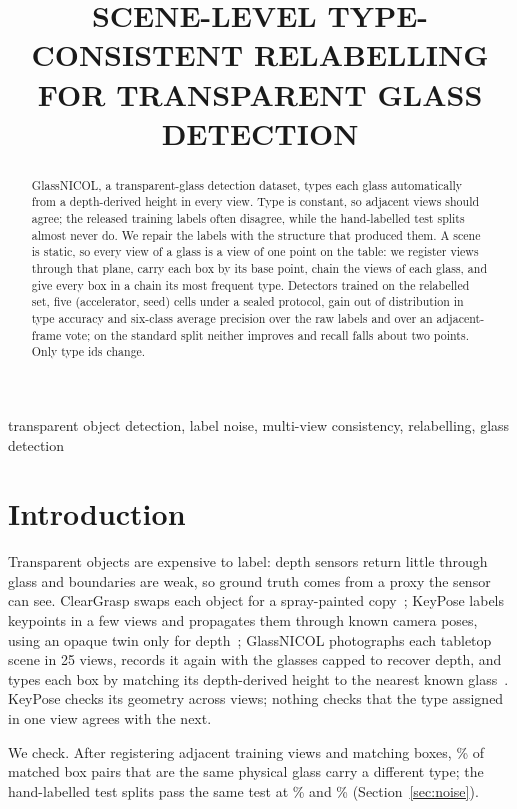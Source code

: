 \documentclass{article}
\title{SCENE-LEVEL TYPE-CONSISTENT RELABELLING FOR TRANSPARENT GLASS DETECTION}
\begin{document}
\ninept
\maketitle

\begin{abstract}
GlassNICOL, a transparent-glass detection dataset, types each glass automatically from a depth-derived height in every view. Type is constant, so adjacent views should agree; the released training labels often disagree, while the hand-labelled test splits almost never do. We repair the labels with the structure that produced them. A scene is static, so every view of a glass is a view of one point on the table: we register views through that plane, carry each box by its base point, chain the views of each glass, and give every box in a chain its most frequent type. Detectors trained on the relabelled set, five (accelerator, seed) cells under a sealed protocol, gain out of distribution in type accuracy and six-class average precision over the raw labels and over an adjacent-frame vote; on the standard split neither improves and recall falls about two points. Only type ids change.
\end{abstract}

\begin{keywords}
transparent object detection, label noise, multi-view consistency, relabelling, glass detection
\end{keywords}

\section{Introduction}
\label{sec:intro}
Transparent objects are expensive to label: depth sensors return little through glass and boundaries are weak, so ground truth comes from a proxy the sensor can see. ClearGrasp swaps each object for a spray-painted copy~\cite{sajjan2020cleargrasp}; KeyPose labels keypoints in a few views and propagates them through known camera poses, using an opaque twin only for depth~\cite{liu2020keypose}; GlassNICOL photographs each tabletop scene in 25 views, records it again with the glasses capped to recover depth, and types each box by matching its depth-derived height to the nearest known glass~\cite{gajdosech2025glassnicol}. KeyPose checks its geometry across views; nothing checks that the type assigned in one view agrees with the next.

We check. After registering adjacent training views and matching boxes, \FlipRateReg\% of matched box pairs that are the same physical glass carry a different type; the hand-labelled test splits pass the same test at \ManStdFlipRate\% and \ManOODFlipRate\% (Section~\ref{sec:noise}).
\end{document}
